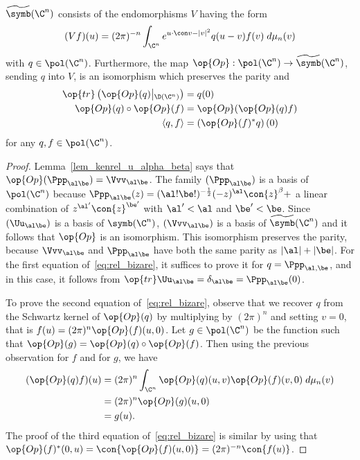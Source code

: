 \begin{prop}\label{prop:tilde_symb_and_op}
$\widetilde{\symb} (\C^n)$ consists of the endomorphisms $V$ having the form
\begin{gather}\label{eq:sch_ker}
(V f)(u) = (2\pi)^{-n} \int_{\C^n} e^{u\cdot \con v - |v|^2} q (u-v) f(v) \; d\mu_n (v)
\end{gather}
with $q \in \pol (\C^n)$. Furthermore, the map $\op{Op} : \pol (\C^n) \rightarrow
\widetilde{\symb} (\C^n)$, sending $q$ into $V$, is an isomorphism which preserves the parity  and
\begin{equation} \label{eq:rel_bizare}
\begin{split}
\op{tr} \left(\op{Op} (q)\middle|_{\D (\C^n)} \right) &= q (0) \\
 \op{Op} (q) \circ \op{Op} (f) &= \op{Op} (\op{Op} (q) f) \\
 \langle q, f \rangle &= \left(\op{Op}(f)^* q\right)(0)
\end{split}
\end{equation}
for any $q, f \in \pol (\C^n)$. 
\end{prop}
\begin{proof}
Lemma~\ref{lem_kenrel_u_alpha_beta} says that $\op{Op} (\Ppp_{\al\be}) =
\Vvv_{\al \be}$. The family $(\Ppp_{\al\be})$ is a basis of $\pol (\C^n)$ because $\Ppp_{\al\be} (z) = (\al ! \be !) ^{-\frac{1}{2}}(- z)^{\al} \con{z}^{\beta} + $ a linear combination of $z^{\al'} \con{z}^{\be'}$ with $\al' < \al$ and $\be' < \be$. Since $(\Uu_{\al\be})$ is a basis of $\symb (\C^n)$, $(\Vvv_{\al \be})$ is a basis of $\widetilde { \symb } (\C^n)$ and it follows that $\op{Op}$ is an isomorphism. This isomorphism preserves the parity, because $\Vvv_{\al
\be} $ and $\Ppp_{\al\be}$ have both the same parity as $|\al| + |\be|$. For the first equation of~\eqref{eq:rel_bizare}, it suffices to prove it for $q = \Ppp_{\al,\be}$, and in this case, it follows from $\op{tr}
\Uu_{\al\be} =\delta_{\al\be} = \Ppp_{\al\be} (0)$.

To prove the second equation of~\eqref{eq:rel_bizare}, observe that we recover $q$ from the Schwartz kernel of $\op{Op} (q)$  by multiplying by $(2\pi)^{n}$ and setting $v = 0 $, that is $ f(u) = (2 \pi)^n \op{Op} (f)\linebreak(u,0)$. Let $g \in \pol (\C^n)$ be the function such that $\op{Op} (g) = \op{Op} (q) \circ \op{Op} (f)$. Then using the previous observation for $f$ and for $g$, we have
\begin{align*}
(\op{Op} (q) f) (u) &=  (2\pi)^n \int_{\C^n} \op{Op}(q) (u,v) \op{Op} (f) (v,0) \; d\mu_n (v) \\
&=  (2 \pi)^n \op{Op}(g) (u,0) \\
&=  g (u).
\end{align*}
The proof of the third equation of~\eqref{eq:rel_bizare} is similar by using that $ \op{Op}(f)^* (0,u) = \con{\op{Op} (f) (u,0)}= (2 \pi)^{-n} \con{f (u)}$.
\end{proof}



